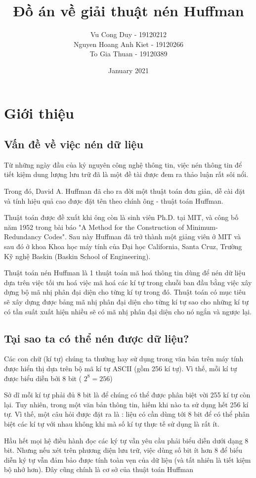 \documentclass[14pt]{extreport}
\title{Đồ án về giải thuật nén Huffman}
\author{Vu Cong Duy - 19120212

Nguyen Hoang Anh Kiet - 19120266

To Gia Thuan - 19120389
}
\date{January 2021}
\begin{document}
\maketitle

\chapter{Giới thiệu}
\section{Vấn đề về việc nén dữ liệu}

Từ những ngày đầu của kỷ nguyên công nghệ thông tin, việc nén thông tin để tiết kiệm dung lượng lưu trữ đã là một đề tài được đem ra thảo luận rất sôi nổi.

Trong đó, David A. Huffman đã cho ra đời một thuật toán đơn giản, dễ cài đặt và tính hiệu quả cao được đặt tên theo chính ông - thuật toán Huffman.

Thuật toán được đề xuất khi ông còn là sinh viên Ph.D. tại MIT, và công bố năm 1952 trong bài báo "A Method for the Construction of Minimum-Redundancy Codes". Sau này Huffman đã trở thành một giảng viên ở MIT và sau đó ở khoa Khoa học máy tính của Đại học California, Santa Cruz, Trường Kỹ nghệ Baskin (Baskin School of Engineering). 

Thuật toán nén Huffman là 1 thuật toán mã hoá thông tin dùng để nén dữ liệu dựa trên việc tối ưu hoá việc mã hoá các kí tự trong chuỗi ban đầu bằng việc xây dựng bộ mã nhị phân đại diện cho từng kí tự trong đó. Thuật toán có mục tiêu sẽ xây dựng được bảng mã nhị phân đại diện cho từng kí tự sao cho những kí tự có tần suất xuất hiện nhiều sẽ có mã nhị phân đại diện cho nó ngắn và ngược lại.
\section{Tại sao ta có thể nén được dữ liệu?}
Các con chữ (kí tự) chúng ta thường hay sử dụng trong văn bản trên máy tính được hiển thị dựa trên bộ mã kí tự ASCII (gồm 256 kí tự). Vì thế, mỗi kí tự được biểu diễn bởi 8 bit ( $2^8 =256$)

Sở dĩ mỗi kí tự phải đủ 8 bit là để chúng có thể được phân biệt vời 255 kí tự còn lại. Tuy nhiên, trong một văn bản thông tin, hiếm khi nào ta sử dụng hết 256 kí tự. Vì thế, một câu hỏi được đặt ra là : liệu có cần dùng tới 8 bit để có thể phân biệt các kí tự với nhau không khi mà số kí tự thực tế sử dụng là rất ít.

Hầu hết mọi hệ điều hành đọc các ký tự vẫn yêu cầu phải biểu diễn dưới dạng 8 bit. Nhưng nếu xét trên phương diện lưu trữ, việc dùng số bit ít hơn 8 để biểu diễn ký tự vẫn đảm bảo được tính toàn vẹn của dữ liệu (và tất nhiên là tiết kiệm bộ nhớ hơn). Đây cũng chính là cơ sở của thuật toán Huffman
\end{document}
